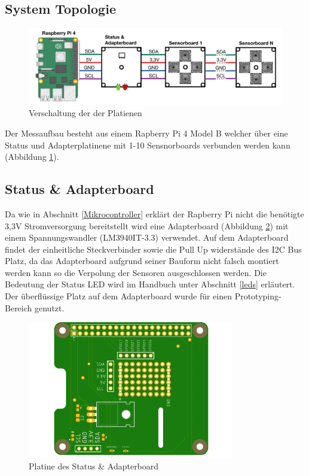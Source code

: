 \subsection{System Topologie}
\begin{figure}[H]
\centering
\includegraphics[width=1\textwidth]{img/System-Topologie.png}
\caption{Verschaltung der der Platienen \cite{raspberrypi_fundation}}
\label{fig:Verschaltung_der_P}
\end{figure}

Der Messaufbau besteht aus einem Rapberry Pi 4 Model B welcher über eine Status und Adapterplatinene mit 1-10 Sensnorboards verbunden werden kann (Abbildung \ref{fig:Verschaltung_der_P}).


\subsection{Status \& Adapterboard}
Da wie in Abschnitt \ref{Mikrocontroller} erklärt der Rapberry Pi nicht die benötigte 3,3V Stromversorgung bereitstellt wird eine Adapterboard (Abbildung \ref{fig:Adapter-Shield}) mit einem Spannungswandler (LM3940IT-3.3) verwendet.
Auf dem Adapterboard findet der einheitliche Steckverbinder sowie die Pull Up widerstände des I2C Bus Platz, da das Adapterboard aufgrund seiner Bauform nicht falsch montiert werden kann so die Verpolung der Sensoren ausgeschlossen werden.
Die Bedeutung der Status LED wird im Handbuch unter Abschnitt \ref{leds} erläutert.\\ 
Der überflüssige Platz auf dem Adapterboard wurde für einen Prototyping-Bereich genutzt.

\begin{figure}[H]
\centering
\includegraphics[width=0.8\textwidth]{img/pi-shield}
\caption{Platine des Status \& Adapterboard}
\label{fig:Adapter-Shield}
\end{figure}
